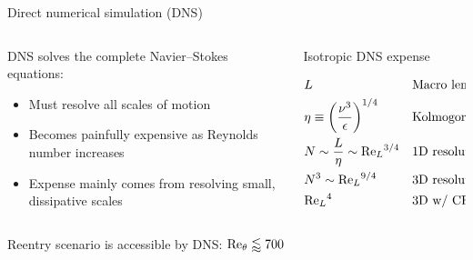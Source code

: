 \documentclass[mathserif]{beamer}
\begin{document}
\begin{frame}{Direct numerical simulation (DNS)}
\begin{columns}[c]
  \begin{column}{.50\textwidth}
    DNS solves the complete Navier--Stokes equations:
    \begin{itemize}
      \item Must resolve all scales of motion
      \item Becomes painfully expensive as Reynolds number increases
      \item Expense mainly comes from resolving small, dissipative scales
    \end{itemize}
  \end{column}
  \begin{column}{.45\textwidth}
    \begin{block}{Isotropic DNS expense}
      \begin{footnotesize}
      \begin{align*}
        &L
        &&\text{Macro length scale}
        \\
        &\eta \equiv \left(\frac{\nu^{3}}{\epsilon}\right)^{1/4}
        &&\text{Kolmogorov scale}
        \\
        &N \sim \frac{L}{\eta} \sim \Reynolds[L]{}^{3/4}
        &&\text{1D resolution}
        \\
        &N^{3} \sim \Reynolds[L]{}^{9/4}
        &&\text{3D resolution}
        \\
        &\Reynolds[L]{}^{4}
        &&\text{3D w/ CFL}
      \end{align*}
      \end{footnotesize}
    \end{block}
  \end{column}
\end{columns}
\vfill
    Reentry scenario is accessible by DNS:
    $\Reynolds[\theta]{}\lessapprox 700$
\end{frame}
\end{document}
